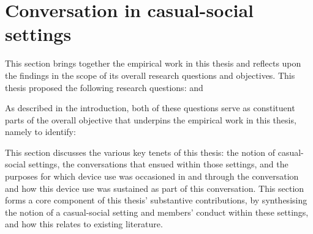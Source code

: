 





\crpagebreak\section{Conversation in casual-social settings}\label{sec:synopsis discussion conduct}
\begin{revisedsubmission}
This section brings together the empirical work in this thesis and reflects upon the findings in the scope of its overall research questions and objectives.
This thesis proposed the following research questions:
\noindent and

\noindent{}As described in the introduction, both of these questions serve as constituent parts of the overall objective that underpins the empirical work in this thesis, namely to identify:

\noindent{}This section discusses the various key tenets of this thesis: the notion of casual-social settings, the conversations that ensued within those settings, and the purposes for which device use was occasioned in and through the conversation and how this device use was sustained as part of this conversation.
This section forms a core component of this thesis' substantive contributions, by synthesising the notion of a casual-social setting and members' conduct within these settings, and how this relates to existing literature.
\end{revisedsubmission}





